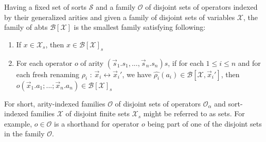 \documentclass{article}
\begin{document}
Having a fixed set of sorts $\mathcal{S}$ and a family $\mathcal{O}$ of disjoint sets of operators indexed by their generalized arities and given a family of disjoint sets of variables $\mathcal{X}$, the family of abts $\mathcal{B}[\mathcal{X}]$ is the smallest family satisfying following:

\begin{enumerate}
    \item If $x \in \mathcal{X}_s$, then $x \in \mathcal{B}[\mathcal{X}]_s$
    \item For each operator $o$ of arity $(\vec{s}_1.s_1,...,\vec{s}_n.s_n)s$, if for each $1 \leq i \leq n$ and for each fresh renaming $\rho_i$ : $\vec{x}_i \leftrightarrow \vec{x}_i'$, we have $\hat{\rho_i}(a_i) \in \mathcal{B}[\mathcal{X}, \vec{x}_i']$, then $o(\vec{x}_1.a_1;...;\vec{x}_n.a_n) \in \mathcal{B}[\mathcal{X}]_s$
\end{enumerate}

For short, arity-indexed families $\mathcal{O}$ of disjoint sets of operators $\mathcal{O}_\alpha$ and sort-indexed families $\mathcal{X}$ of disjoint finite sets $\mathcal{X}_s$ might be referred to as sets. For example, $o \in \mathcal{O}$ is a shorthand for operator $o$ being part of one of the disjoint sets in the family $\mathcal{O}$.



\printbibliography
\end{document}
